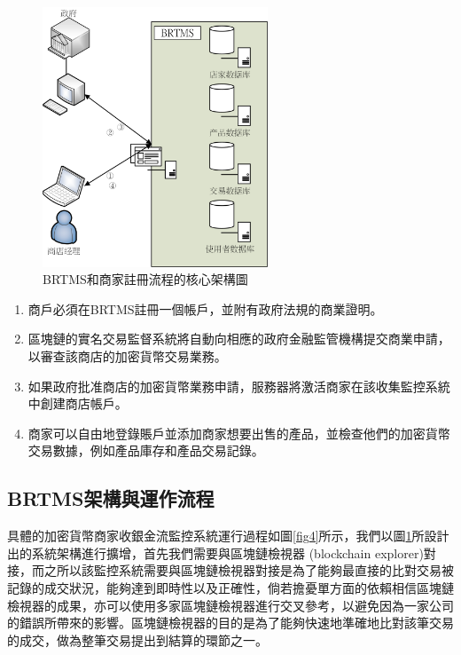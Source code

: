 	\begin{figure}[!htbp]
		\centering
		\includegraphics[width = 0.6\textwidth]{fig3.png}
		\caption{BRTMS和商家註冊流程的核心架構圖}\label{fig3}
	\end{figure}

	\begin{enumerate}
		\item 商戶必須在BRTMS註冊一個帳戶，並附有政府法規的商業證明。
		\item 區塊鏈的實名交易監督系統將自動向相應的政府金融監管機構提交商業申請，以審查該商店的加密貨幣交易業務。
		\item 如果政府批准商店的加密貨幣業務申請，服務器將激活商家在該收集監控系統中創建商店帳戶。
		\item 商家可以自由地登錄賬戶並添加商家想要出售的產品，並檢查他們的加密貨幣交易數據，例如產品庫存和產品交易記錄。
	\end{enumerate}

	\subsection{BRTMS架構與運作流程}
	具體的加密貨幣商家收銀金流監控系統運行過程如圖\ref{fig4}所示，我們以圖\ref{fig3}所設計出的系統架構進行擴增，首先我們需要與區塊鏈檢視器 (blockchain explorer)對接，而之所以該監控系統需要與區塊鏈檢視器對接是為了能夠最直接的比對交易被記錄的成交狀況，能夠達到即時性以及正確性，倘若擔憂單方面的依賴相信區塊鏈檢視器的成果，亦可以使用多家區塊鏈檢視器進行交叉參考，以避免因為一家公司的錯誤所帶來的影響。區塊鏈檢視器的目的是為了能夠快速地準確地比對該筆交易的成交，做為整筆交易提出到結算的環節之一。

